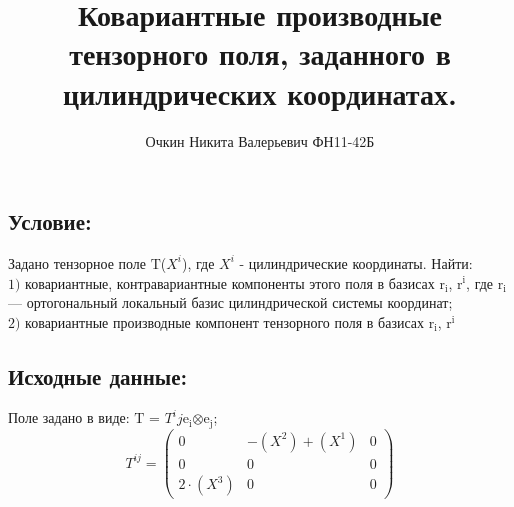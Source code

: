 \documentclass[a4paper, 12pt, oneside]{article}
\title{Ковариантные производные тензорного поля, заданного в цилиндрических координатах.}
\author{Очкин Никита Валерьевич ФН11-42Б}
\begin{document}
\maketitle
\subsection*{Условие:}
Задано тензорное поле $\mathrm{T}$($X^i$), где $X^i$ - цилиндрические координаты. Найти:\\
$\mathrm{1)}$ ковариантные, контравариантные компоненты этого поля в базисах $\mathrm{r_i}$, $\mathrm{r^i}$,
где $\mathrm{r_i}$ — ортогональный локальный базис цилиндрической системы координат;\\
$\mathrm{2)}$ ковариантные производные компонент тензорного поля в базисах $\mathrm{r_i}$, $\mathrm{r^i}$\\
\subsection*{Исходные данные:}
Поле задано в виде: $\mathrm{T}$ = $T^ij$$\mathrm{e_i}$$\otimes$$\mathrm{e_j}$;\\

\[
T^{ij}=\begin{pmatrix}
	0 & -(X^2) + (X^1) & 0\\
	0 & 0 & 0\\
	2\cdot (X^3) & 0 & 0
\end{pmatrix}
\]
\end{document}
